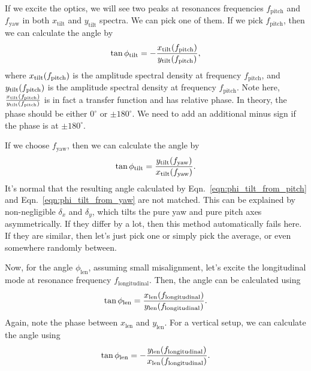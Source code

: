 If we excite the optics, we will see two peaks at resonances frequencies $f_\mathrm{pitch}$ and $f_\mathrm{yaw}$ in both $x_\mathrm{tilt}$ and $y_\mathrm{tilt}$ spectra.
We can pick one of them.
If we pick $f_\mathrm{pitch}$, then we can calculate the angle by
\begin{equation}
	\tan\phi_\mathrm{tilt} = -\frac{x_\mathrm{tilt}\mleft(f_\mathrm{pitch}\mright)}{y_\mathrm{tilt}\mleft(f_\mathrm{pitch}\mright)},
	\label{eqn:phi_tilt_from_pitch}
\end{equation}
where $x_\mathrm{tilt}\mleft(f_\mathrm{pitch}\mright)$ is the amplitude spectral density at frequency $f_\mathrm{pitch}$, and $y_\mathrm{tilt}\mleft(f_\mathrm{pitch}\mright)$ is the amplitude spectral density at frequency $f_\mathrm{pitch}$.
Note here, $\frac{x_\mathrm{tilt}\mleft(f_\mathrm{pitch}\mright)}{y_\mathrm{tilt}\mleft(f_\mathrm{pitch}\mright)}$ is in fact a transfer function and has relative phase.
In theory, the phase should be either $0^\circ$ or $\pm180^\circ$.
We need to add an additional minus sign if the phase is at $\pm180^\circ$.

If we choose $f_\mathrm{yaw}$, then we can calculate the angle by
\begin{equation}
	\tan\phi_\mathrm{tilt} = \frac{y_\mathrm{tilt}\mleft(f_\mathrm{yaw}\mright)}{x_\mathrm{tilt}\mleft(f_\mathrm{yaw}\mright)}.
	\label{eqn:phi_tilt_from_yaw}
\end{equation}
It's normal that the resulting angle calculated by Eqn.~\eqref{eqn:phi_tilt_from_pitch} and Eqn.~\eqref{eqn:phi_tilt_from_yaw} are not matched.
This can be explained by non-negligible $\delta_x$ and $\delta_y$, which tilts the pure yaw and pure pitch axes asymmetrically.
If they differ by a lot, then this method automatically fails here.
If they are similar, then let's just pick one or simply pick the average, or even somewhere randomly between.

Now, for the angle $\phi_\mathrm{len}$, assuming small misalignment, let's excite the longitudinal mode at resonance frequency $f_\mathrm{longitudinal}$.
Then, the angle can be calculated using
\begin{equation}
	\tan\phi_\mathrm{len} = \frac{x_\mathrm{len}\mleft(f_\mathrm{longitudinal}\mright)}{y_\mathrm{len}\mleft(f_\mathrm{longitudinal}\mright)}.
\end{equation}
Again, note the phase between $x_\mathrm{len}$ and $y_\mathrm{len}$.
For a vertical setup, we can calculate the angle using
\begin{equation}
	\tan\phi_\mathrm{len} = -\frac{y_\mathrm{len}\mleft(f_\mathrm{longitudinal}\mright)}{x_\mathrm{len}\mleft(f_\mathrm{longitudinal}\mright)}.
\end{equation}

